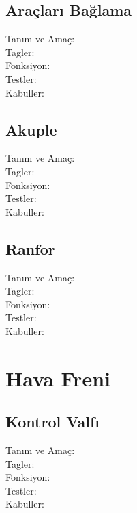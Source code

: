 \documentclass[10pt,a4paper]{article}
\begin{document}
\subsection{Araçları Bağlama}
\begin{description}
\item[Tanım ve Amaç:] 
\item[Tagler:]
\item[Fonksiyon:]
\item[Testler:]
\item[Kabuller:]
\end{description}
\newpage

\subsection{Akuple}
\begin{description}
\item[Tanım ve Amaç:] 
\item[Tagler:]
\item[Fonksiyon:]
\item[Testler:]
\item[Kabuller:]
\end{description}
\newpage

\subsection{Ranfor}
\begin{description}
\item[Tanım ve Amaç:] 
\item[Tagler:]
\item[Fonksiyon:]
\item[Testler:]
\item[Kabuller:]
\end{description}

\newpage

\section{Hava Freni}

\subsection{Kontrol Valfı}
\begin{description}
\item[Tanım ve Amaç:] 
\item[Tagler:]
\item[Fonksiyon:]
\item[Testler:]
\item[Kabuller:]
\end{description}
\newpage
\end{document}
